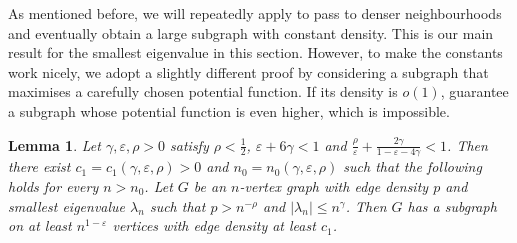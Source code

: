 \documentclass[11pt]{article}
\theoremstyle{plain}
\newtheorem{lemma}[theorem]{Lemma}
\theoremstyle{definition}
\newcommand{\eps}{\varepsilon}
\begin{document}
As mentioned before, we will repeatedly apply  to pass to denser neighbourhoods and eventually obtain a large subgraph with constant density.
This is our main result for the smallest eigenvalue in this section.
However, to make the constants work nicely, we adopt a slightly different proof by considering a subgraph that maximises a carefully chosen potential function.
If its density is $o(1)$,  guarantee a subgraph whose potential function is even higher, which is impossible.
\begin{lemma}\label{lemma:dens1_main}
    Let $\gamma,\eps,\rho > 0$ satisfy $\rho < \frac{1}{2}$, $\eps + 6\gamma < 1$ and $\frac{\rho}{\eps} + \frac{2\gamma}{1-\eps-4\gamma} < 1$. 
    Then there exist $c_1=c_1(\gamma,\eps,\rho)>0$ and $n_0=n_0(\gamma,\eps,\rho)$ such that the following holds for every $n > n_0$.
    Let $G$ be an $n$-vertex graph with edge density $p$ and smallest eigenvalue $\lambda_n$ such that $p>n^{-\rho}$ and $|\lambda_n|\leq n^\gamma$.
    Then $G$ has a subgraph on at least $n^{1-\eps}$ vertices with edge density at least $c_1$. 
\end{lemma}
\end{document}
